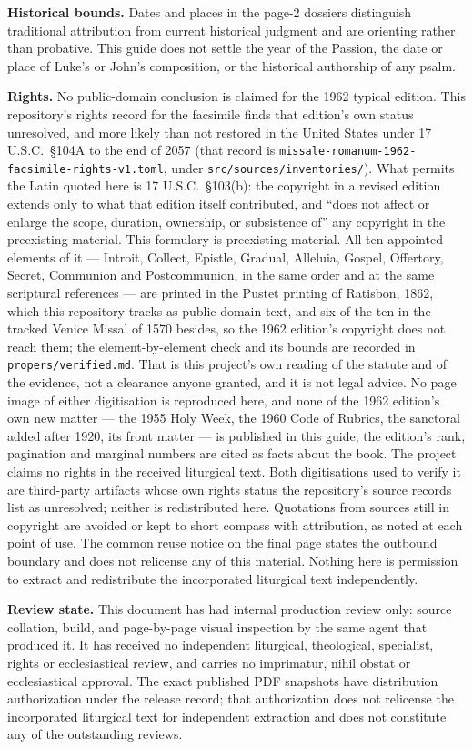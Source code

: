 \textbf{Historical bounds.} Dates and places in the page-2 dossiers
distinguish traditional attribution from current historical judgment and are
orienting rather than probative. This guide does not settle the year of the
Passion, the date or place of Luke's or John's composition, or the historical
authorship of any psalm.

\textbf{Rights.} No public-domain conclusion is claimed for the 1962 typical
edition. This repository's rights record for the facsimile finds that edition's
own status unresolved, and more likely than not restored in the United States
under 17 U.S.C.\ \S104A to the end of 2057 (that record is
\texttt{missale-romanum-1962-facsimile-rights-v1.toml}, under
\texttt{src/sources/inventories/}).
What permits the Latin quoted here is 17 U.S.C.\ \S103(b): the copyright in a
revised edition extends only to what that edition itself contributed, and ``does
not affect or enlarge the scope, duration, ownership, or subsistence of'' any
copyright in the preexisting material. This formulary is preexisting material.
All ten appointed elements of it --- Introit, Collect, Epistle, Gradual,
Alleluia, Gospel, Offertory, Secret, Communion and Postcommunion, in the same
order and at the same scriptural references --- are printed in the Pustet
printing of Ratisbon, 1862, which this repository tracks as public-domain text,
and six of the ten in the tracked Venice Missal of 1570 besides, so the 1962
edition's copyright does not reach them; the element-by-element check and its
bounds are recorded in \texttt{propers/verified.md}.
That is this project's own reading of the statute and of the evidence,
not a clearance anyone granted, and it is not legal advice. No page image of
either digitisation is reproduced here, and none of the 1962 edition's own new
matter --- the 1955 Holy Week, the 1960 Code of Rubrics, the sanctoral added
after 1920, its front matter --- is published in this guide; the edition's rank,
pagination and marginal numbers are cited as facts about the book. The project
claims no rights in the received liturgical text. Both digitisations used to
verify it are third-party artifacts whose own
rights status the repository's source records list as unresolved; neither is
redistributed here. Quotations from sources still in copyright are avoided or
kept to short compass with attribution, as noted at each point of use. The
common reuse notice on the final page states the outbound boundary and does
not relicense any of this material. Nothing here is permission to extract and
redistribute the incorporated liturgical text independently.

\textbf{Review state.} This document has had internal production review only:
source collation, build, and page-by-page visual inspection by the same agent
that produced it. It has received no independent liturgical, theological,
specialist, rights or ecclesiastical review, and carries no imprimatur, nihil
obstat or ecclesiastical approval. The exact published PDF snapshots have
distribution authorization under the release record; that authorization does
not relicense the incorporated liturgical text for independent extraction and
does not constitute any of the outstanding reviews.
